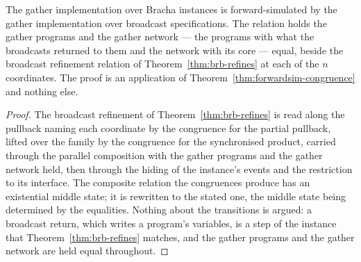 \begin{theorem}
  \label{thm:gather-broadcast-substitution}
  \leanok
  The gather implementation over Bracha instances is forward-simulated by the gather implementation over broadcast specifications.
  The relation holds the gather programs and the gather network --- the programs with what the broadcasts returned to them and the network with its core --- equal, beside the broadcast refinement relation of Theorem~\ref{thm:brb-refines} at each of the $n$ coordinates.
  The proof is an application of Theorem~\ref{thm:forwardsim-congruence} and nothing else.
\end{theorem}

\begin{proof}\leanok
  The broadcast refinement of Theorem~\ref{thm:brb-refines} is read along the pullback naming each coordinate by the congruence for the partial pullback, lifted over the family by the congruence for the synchronised product, carried through the parallel composition with the gather programs and the gather network held, then through the hiding of the instance's events and the restriction to its interface.
  The composite relation the congruences produce has an existential middle state; it is rewritten to the stated one, the middle state being determined by the equalities.
  Nothing about the transitions is argued: a broadcast return, which writes a program's variables, is a step of the instance that Theorem~\ref{thm:brb-refines} matches, and the gather programs and the gather network are held equal throughout.
\end{proof}
